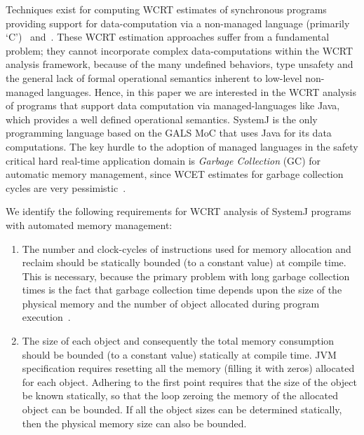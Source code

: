 Techniques exist for computing WCRT estimates of synchronous programs
providing support for data-computation via a non-managed language
(primarily `C')~\cite{boldt07} and~\cite{proop10}. These WCRT estimation
approaches suffer from a fundamental problem; they cannot incorporate
complex data-computations within the WCRT analysis framework, because of
the many undefined behaviors, type unsafety and the general lack of
formal operational semantics inherent to low-level non-managed
languages. Hence, in this paper we are interested in the WCRT analysis
of programs that support data computation via managed-languages like
Java, which provides a well defined operational
semantics. {\color{black} SystemJ is the only programming language based
  on the GALS MoC that uses Java for its data computations.} The key
hurdle to the adoption of managed languages in the safety critical hard
real-time application domain is \textit{Garbage Collection} (GC) for
automatic memory management, since WCET estimates for garbage collection
cycles are very pessimistic~\cite{puffitsch2013design}.

{\color{black}

  We identify the following requirements for WCRT analysis of SystemJ
  programs with automated memory management:

  \begin{enumerate}

  \item The number and clock-cycles of instructions used for memory
    allocation and reclaim should be statically bounded (to a constant
    value) at compile time. This is necessary, because the primary
    problem with long garbage collection times is the fact that garbage
    collection time depends upon the size of the physical memory and the
    number of object allocated during program
    execution~\cite{schoeberl2010scheduling}.

  \item The size of each object and consequently the total memory
    consumption should be bounded (to a constant value) statically at
    compile time. JVM specification requires resetting all the memory
    (filling it with zeros) allocated for each object. Adhering to the
    first point requires that the size of the object be known
    statically, so that the loop zeroing the memory of the allocated
    object can be bounded. If all the object sizes can be determined
    statically, then the physical memory size can also be bounded.

  \end{enumerate}

}

